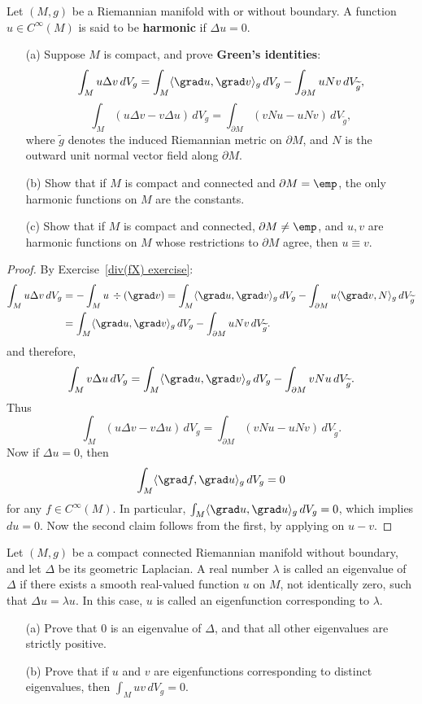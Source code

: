 \begin{exercise}\label{harmonic exercise}
Let $(M,g)$ be a Riemannian manifold with or without boundary. A function $u\in C^\infty(M)$ is said to be \textbf{harmonic} if $\Delta u=0$.
\begin{itemize}
\item[(a)] Suppose $M$ is compact, and prove \textbf{Green's identities}:
\[\int_M u\Delta v\,dV_g=\int_M\langle\grad u,\grad v\rangle_g\,dV_g-\int_{\partial M} uNv\,dV_{\widetilde{g}},\]
\[\int_M(u\Delta v-v\Delta u)\,dV_g=\int_{\partial M}(vNu-uNv)\,dV_{\widetilde{g}},\]
where $\widetilde{g}$ denotes the induced Riemannian metric on $\partial M$, and $N$ is the outward unit normal vector field along $\partial M$.
\item[(b)] Show that if $M$ is compact and connected and $\partial M=\emp$, the only harmonic functions on $M$ are the constants.
\item[(c)] Show that if $M$ is compact and connected, $\partial M\neq\emp$, and $u,v$ are harmonic functions on $M$ whose restrictions to $\partial M$ agree, then $u\equiv v$.
\end{itemize}
\end{exercise}
\begin{proof}
By Exercise~\ref{div(fX) exercise}:
\begin{align*}
\int_M u\Delta v\,dV_g&=-\int_Mu\,\div(\grad v)=\int_{M}\langle\grad u,\grad v\rangle_g\,dV_g-\int_{\partial M}u\langle\grad v,N\rangle_g\,dV_{\widetilde{g}}\\
&=\int_{M}\langle\grad u,\grad v\rangle_g\,dV_g-\int_{\partial M}uNv\,dV_{\widetilde{g}}.
\end{align*}
and therefore,
\begin{align*}
\int_M v\Delta u\,dV_g=\int_{M}\langle\grad u,\grad v\rangle_g\,dV_g-\int_{\partial M}vNu\,dV_{\widetilde{g}}.
\end{align*}
Thus
\[\int_M(u\Delta v-v\Delta u)\,dV_g=\int_{\partial M}(vNu-uNv)\,dV_{\widetilde{g}}.\]
Now if $\Delta u=0$, then 
\[\int_M\langle\grad f,\grad u\rangle_g\,dV_g=0\]
for any $f\in C^\infty(M)$. In particular, $\int_M\langle\grad u,\grad u\rangle_g\,dV_g=0$, which implies $du=0$. Now the second claim follows from the first, by applying on $u-v$.
\end{proof}
\begin{exercise}
Let $(M,g)$ be a compact connected Riemannian manifold without boundary, and let $\Delta$ be its geometric Laplacian. A real number $\lambda$ is called an eigenvalue of $\Delta$ if there exists a smooth real-valued function $u$ on $M$, not identically zero, such that $\Delta u=\lambda u$. In this case, $u$ is called an eigenfunction corresponding to $\lambda$.
\begin{itemize}
\item[(a)] Prove that $0$ is an eigenvalue of $\Delta$, and that all other eigenvalues are strictly positive.
\item[(b)] Prove that if $u$ and $v$ are eigenfunctions corresponding to distinct eigenvalues, then $\int_Muv\,dV_g=0$.
\end{itemize}
\end{exercise}
